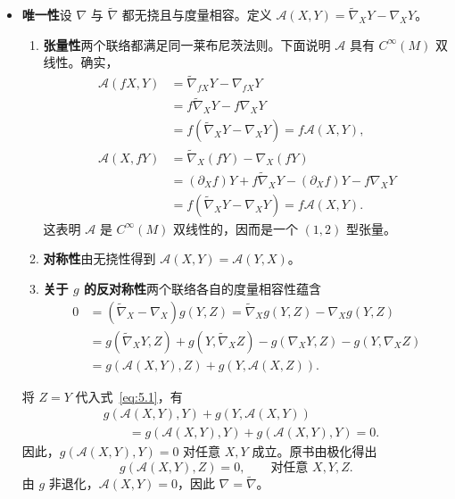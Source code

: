 \begin{itemize}
  \item \textbf{唯一性}\quad 设 $\nabla$ 与 $\tilde\nabla$ 都无挠且与度量相容。定义 $\mathcal A(X,Y)=\tilde\nabla_XY-\nabla_XY$。
  \begin{enumerate}[label=\arabic*.]
    \item \textbf{张量性}\quad 两个联络都满足同一莱布尼茨法则。下面说明 $\mathcal A$ 具有 $C^\infty(M)$ 双线性。确实，
    \[
      \begin{aligned}
        \mathcal A(fX,Y)
          &=\tilde\nabla_{fX}Y-\nabla_{fX}Y\\
          &=f\tilde\nabla_XY-f\nabla_XY\\
          &=f(\tilde\nabla_XY-\nabla_XY)=f\mathcal A(X,Y),\\
        \mathcal A(X,fY)
          &=\tilde\nabla_X(fY)-\nabla_X(fY)\\
          &=(\partial_X f)Y+f\tilde\nabla_XY-(\partial_X f)Y-f\nabla_XY\\
          &=f(\tilde\nabla_XY-\nabla_XY)=f\mathcal A(X,Y).
      \end{aligned}
    \]
    这表明 $\mathcal A$ 是 $C^\infty(M)$ 双线性的，因而是一个 $(1,2)$ 型张量。
    \item \textbf{对称性}\quad 由无挠性得到 $\mathcal A(X,Y)=\mathcal A(Y,X)$。
    \item \textbf{关于 $g$ 的反对称性}\quad 两个联络各自的度量相容性蕴含
    \begin{equation*}
      \begin{aligned}
        0&=(\tilde\nabla_X-\nabla_X)g(Y,Z)
           =\tilde\nabla_Xg(Y,Z)-\nabla_Xg(Y,Z)\\
         &=g(\tilde\nabla_XY,Z)+g(Y,\tilde\nabla_XZ)
           -g(\nabla_XY,Z)-g(Y,\nabla_XZ)\\
         &=g(\mathcal A(X,Y),Z)+g(Y,\mathcal A(X,Z)).
      \end{aligned}
      \tag{5.1}\label{eq:5.1}
    \end{equation*}
  \end{enumerate}
  将 $Z=Y$ 代入式~\eqref{eq:5.1}，有
  \[
    \begin{aligned}
      &g(\mathcal A(X,Y),Y)+g(Y,\mathcal A(X,Y))\\
      &\qquad=g(\mathcal A(X,Y),Y)+g(\mathcal A(X,Y),Y)=0.
    \end{aligned}
  \]
  因此，$g(\mathcal A(X,Y),Y)=0$ 对任意 $X,Y$ 成立。原书由极化得出
  \[
    g(\mathcal A(X,Y),Z)=0,\qquad \text{对任意 }X,Y,Z.
  \]
  由 $g$ 非退化，$\mathcal A(X,Y)=0$，因此 $\nabla=\tilde\nabla$。


\end{itemize}
